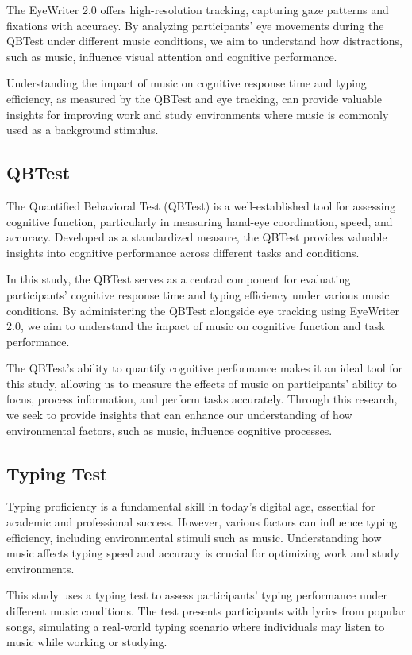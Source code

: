 \documentclass[manuscript, screen]{acmart} %
\begin{document}
The EyeWriter 2.0 offers high-resolution tracking, capturing gaze patterns and fixations with accuracy. By analyzing participants' eye movements during the QBTest under different music conditions, we aim to understand how distractions, such as music, influence visual attention and cognitive performance.

Understanding the impact of music on cognitive response time and typing efficiency, as measured by the QBTest and eye tracking, can provide valuable insights for improving work and study environments where music is commonly used as a background stimulus.

\subsection{QBTest}
The Quantified Behavioral Test (QBTest) is a well-established tool for assessing cognitive function, particularly in measuring hand-eye coordination, speed, and accuracy. Developed as a standardized measure, the QBTest provides valuable insights into cognitive performance across different tasks and conditions.

In this study, the QBTest serves as a central component for evaluating participants' cognitive response time and typing efficiency under various music conditions. By administering the QBTest alongside eye tracking using EyeWriter 2.0, we aim to understand the impact of music on cognitive function and task performance.

The QBTest's ability to quantify cognitive performance makes it an ideal tool for this study, allowing us to measure the effects of music on participants' ability to focus, process information, and perform tasks accurately. Through this research, we seek to provide insights that can enhance our understanding of how environmental factors, such as music, influence cognitive processes.

\subsection{Typing Test}
Typing proficiency is a fundamental skill in today's digital age, essential for academic and professional success. However, various factors can influence typing efficiency, including environmental stimuli such as music. Understanding how music affects typing speed and accuracy is crucial for optimizing work and study environments.

This study uses a typing test to assess participants' typing performance under different music conditions. The test presents participants with lyrics from popular songs, simulating a real-world typing scenario where individuals may listen to music while working or studying.
\end{document}
